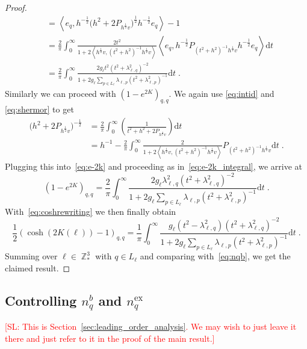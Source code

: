 \documentclass[12pt,a4paper]{article}
\numberwithin{equation}{section}
\newcommand{\1}{\mathbb{I}}
\newcommand{\ex}{\mathrm{ex}}
\DeclareMathOperator{\Z}{\mathbb{Z}}
\newcommand{\half}{\frac{1}{2}}
\newcommand{\eva}[1]{\left\langle #1 \right\rangle}
\theoremstyle{plain}
\theoremstyle{definition}
\theoremstyle{remark}
\theoremstyle{plain}
\theoremstyle{definition}
\theoremstyle{remark}
\begin{document}
\begin{proof}
\begin{align}
	&= \eva{e_q,  h^{-\half} \big(h^2 +2P_{h^{\half} v}\big)^{\half} h^{-\half} e_q} - 1\nonumber\\
	&= \frac{2}{\pi} \int_0^\infty  \frac{2t^2}{1+ 2\eva{h^{\half} v ,(t^2+h^2)^{-1} h^\half v}}  \eva{e_q,h^{-\half} P_{(t^2+h^2)^{-1}h^{\half} v}h^{-\half} e_q}\mathrm{d}t\nonumber\\
	&= \frac{2}{\pi} \int_0^\infty  \frac{2g_\ell t^2 (t^2+\lambda^2_{\ell,q})^{-2}}{1+ 2g_\ell\sum_{p \in L_\ell}\lambda_{\ell,p}(t^2+\lambda^2_{\ell,p})^{-1} }  \mathrm{d}t \;. \label{eq:e-2k_integral}
\end{align}
Similarly we can proceed with $(1-e^{2K})_{q,q}$. We again use \eqref{eq:intid} and \eqref{eq:shermor} to get
\begin{align}
	\big(h^2 +2P_{h^{\half} v}\big)^{-\half}
	&= \frac{2}{\pi} \int_0^\infty \left( \frac{1}{t^2+h^2 +2P_{h^{\half} v}}\right)\mathrm{d}t\\
	&= h^{-1} - \frac{2}{\pi} \int_0^\infty  \frac{2}{1+ 2\eva{h^{\half} v ,(t^2+h^2)^{-1} h^\half v}}  P_{(t^2+h^2)^{-1}h^{\half} v}\mathrm{d}t \;. \label{eq:e2k}
\end{align}
Plugging this into~\eqref{eq:e-2k} and proceeding as in~\eqref{eq:e-2k_integral}, we arrive at
\begin{equation} \label{eq:e2kfin}
	(1-e^{2K})_{q,q}
	= \frac{2}{\pi} \int_0^\infty  \frac{2g_\ell \lambda_{\ell,q}^2 (t^2+\lambda^2_{\ell,q})^{-2}}{1+ 2g_\ell\sum_{p \in L_{\ell}}\lambda_{\ell,p}(t^2+\lambda^2_{\ell,p})^{-1} }  \mathrm{d}t \;.
\end{equation}
With~\eqref{eq:coshrewriting} we then finally obtain
\begin{equation}
	\half (\cosh(2K(\ell))-1)_{q,q} = \frac{1}{\pi} \int_0^\infty  \frac{g_\ell (t^2-\lambda_{\ell,q}^2) (t^2+\lambda^2_{\ell,q})^{-2}}{1+ 2g_\ell\sum_{p \in L_{\ell}}\lambda_{\ell,p}(t^2+\lambda^2_{\ell,p})^{-1} }  \mathrm{d}t \;.
\end{equation}
Summing over $ \ell \in \Z^3_* $ with $ q \in L_\ell $ and comparing with~\eqref{eq:nqb}, we get the claimed result.
\end{proof}


\subsection{Controlling $ n_q^{b} $ and $ n_q^{\ex} $}

\textcolor{red}{[SL: This is Section~\ref{sec:leading_order_analysis}. We may wish to just leave it there and just refer to it in the proof of the main result.]}
\end{document}
